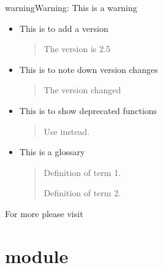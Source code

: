 \documentclass[letterpaper,10pt,english]{sphinxmanual}
\begin{document}
\begin{sphinxadmonition}{warning}{Warning:}
\sphinxAtStartPar
This is a warning
\end{sphinxadmonition}
\begin{itemize}
\item {} 
\sphinxAtStartPar
This is to add a version
\begin{quote}

\sphinxAtStartPar
{}The version is 2.5
\end{quote}

\item {} 
\sphinxAtStartPar
This is to note down version changes
\begin{quote}

\sphinxAtStartPar
{}The version changed
\end{quote}

\item {} 
\sphinxAtStartPar
This is to show deprecated functions
\begin{quote}

\sphinxAtStartPar
{}Use  instead.
\end{quote}

\item {} 
\sphinxAtStartPar
This is a glossary
\begin{quote}
\begin{description}
\sphinxAtStartPar
Definition of term 1.

\sphinxAtStartPar
Definition of term 2.

\end{description}
\end{quote}

\end{itemize}

\sphinxAtStartPar
For more  please visit 

\sphinxstepscope


\chapter{module}
\label{\detokenize{_autosummary/module:module-module}}\label{\detokenize{_autosummary/module:module}}\label{\detokenize{_autosummary/module::doc}}
\end{document}
